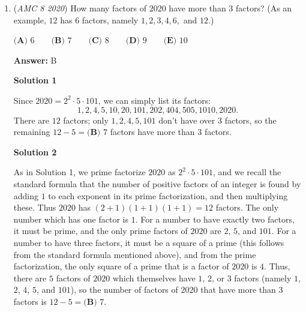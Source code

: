 \begin{enumerate}
 



\textbf{Solution 2}

Following the first few steps of Solution 1, we have $2(A+C+D+E+F)+3B=47$.      Because an even number $2(A+C+D+E+F)$ subtracted from an odd number (47) is always odd, we know that $3B$ is odd, showing that $B$ is odd. Now we know that $B$ is 1, 3, or 5. If we try $B=1$, we get $43=47$, which is not true. Also when we test $B=3$, we get $45=47$, which is also false. Therefore, we end up getting $B = \boxed{\textbf{(E) }5}$.

 -minor edit by tonykuncheng

 -minor edit by Lebron James

 


	\item (\textit{AMC 8 2020}) How many factors of $2020$ have more than $3$ factors? (As an example, $12$ has $6$ factors, namely $1, 2, 3, 4, 6,$ and $12.$)


 $\textbf{(A) }6 \qquad \textbf{(B) }7 \qquad \textbf{(C) }8 \qquad \textbf{(D) }9 \qquad \textbf{(E) }10$

 \textbf{Answer: }B



\textbf{Solution 1}

Since $2020 = 2^2 \cdot 5 \cdot 101$, we can simply list its factors: 
 \[1, 2, 4, 5, 10, 20, 101, 202, 404, 505, 1010, 2020.\] There are $12$ factors; only $1, 2, 4, 5, 101$ don't have over $3$ factors, so the remaining $12-5 = \boxed{\textbf{(B) }7}$ factors have more than $3$ factors.

 



\textbf{Solution 2}

As in Solution 1, we prime factorize $2020$ as $2^2\cdot 5\cdot 101$, and we recall the standard formula that the number of positive factors of an integer is found by adding $1$ to each exponent in its prime factorization, and then multiplying these. Thus $2020$ has $(2+1)(1+1)(1+1) = 12$ factors. The only number which has one factor is $1$. For a number to have exactly two factors, it must be prime, and the only prime factors of $2020$ are $2$, $5$, and $101$. For a number to have three factors, it must be a square of a prime (this follows from the standard formula mentioned above), and from the prime factorization, the only square of a prime that is a factor of $2020$ is $4$. Thus, there are $5$ factors of $2020$ which themselves have $1$, $2$, or $3$ factors (namely $1$, $2$, $4$, $5$, and $101$), so the number of factors of $2020$ that have more than $3$ factors is $12-5=\boxed{\textbf{(B) }7}$.


\end{enumerate}
